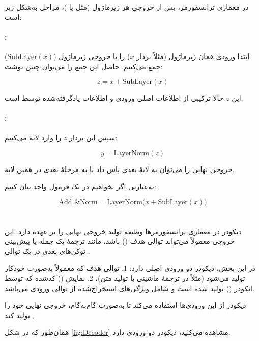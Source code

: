 در معماری ترانسفورمر، پس از خروجیِ هر زیرماژول (مثل  یا )، مراحل به‌شکل زیر است:

\paragraph{:}
ابتدا ورودی همان زیرماژول (مثلاً بردار \( x \)) را با خروجی زیرماژول (\( \text{SubLayer}(x) \)) جمع می‌کنیم. حاصل این جمع را می‌توان چنین نوشت:

\[
z = x + \text{SubLayer}(x)
\]

این \( z \) حالا ترکیبی از اطلاعات اصلی ورودی و اطلاعات یادگرفته‌شده توسط  است.

\paragraph{:}
سپس این بردار \( z \) را وارد لایهٔ  می‌کنیم:

\[
y = \text{LayerNorm}(z)
\]

خروجی نهایی را می‌توان به لایهٔ بعدی پاس داد یا به مرحلهٔ بعدی در همین لایه.

به‌عبارتی اگر بخواهیم در یک فرمول واحد بیان کنیم:

\[
\text{Add \& Norm} = \text{LayerNorm}\bigl(x + \text{SubLayer}(x)\bigr)
\]


\section{}
دیکودر در معماری ترانسفورمرها وظیفهٔ تولید خروجی نهایی را بر عهده دارد. این خروجی معمولاً می‌تواند توالی هدف () باشد، مانند ترجمهٔ یک جمله یا پیش‌بینی توکن‌های بعدی در یک توالی \cite{vaswani2017attention}. 

در این بخش، دیکودر دو ورودی اصلی دارد:  
1. توالی هدف که معمولاً به‌صورت خودکار تولید می‌شود (مثلاً در ترجمهٔ ماشینی یا تولید متن)،  
2. نمایش () کدشده که توسط انکودر () تولید شده است و شامل ویژگی‌های استخراج‌شده از توالی ورودی می‌باشد.  

دیکودر از این ورودی‌ها استفاده می‌کند تا به‌صورت گام‌به‌گام، خروجی نهایی خود را تولید کند \cite{bahdanau2014neural,sutskever2014sequence}.

همان‌طور که در شکل \ref{fig:Decoder} مشاهده می‌کنید، دیکودر دو ورودی دارد.

